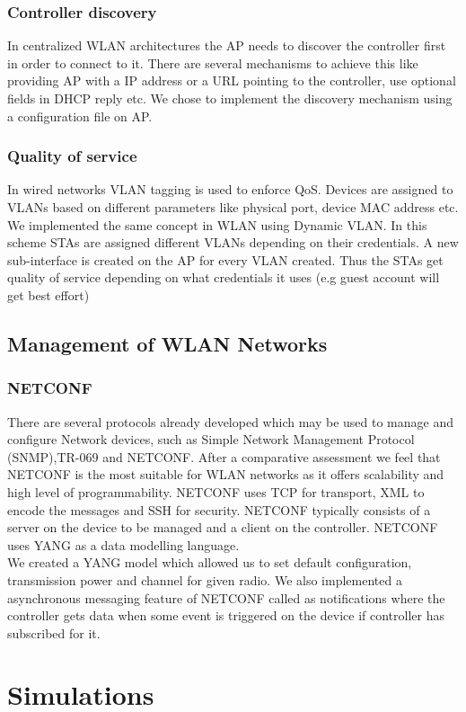 \documentclass[12pt]{article}
\begin{document}
\subsubsection{Controller discovery}
In centralized WLAN architectures the AP needs to discover the controller first in order to connect to it. There are several mechanisms to achieve this like providing AP with a IP address or a URL pointing to the controller, use optional fields in DHCP reply etc. We chose to implement the discovery mechanism using a configuration file on AP.
\subsubsection{Quality of service}
In wired networks VLAN tagging is used to enforce QoS. Devices are assigned to VLANs based on different parameters like physical port, device MAC address etc. We implemented the same concept in WLAN using Dynamic VLAN.  In this scheme STAs are assigned different VLANs depending on their credentials. A new sub-interface is created on the AP for every VLAN created. Thus the STAs get quality of service depending on what credentials it uses (e.g guest account will get best effort)


\subsection{Management of WLAN Networks}
   \subsubsection{NETCONF\cite{NETCONF}}
    There are several protocols already developed which may be used to manage and configure Network devices, such as Simple Network Management Protocol (SNMP),TR-069 and NETCONF. After a comparative assessment we feel that NETCONF is the most suitable for WLAN networks as it offers scalability and high level of programmability. NETCONF uses TCP for transport, XML to encode the messages and SSH for security. NETCONF typically consists of a server on the device to be managed and a client on the controller. NETCONF uses YANG\cite{RFC7950} as a data modelling language.\\
    We created a YANG model which allowed us to set default configuration, transmission power and channel for given radio. We also implemented a asynchronous messaging feature of NETCONF called as notifications where the controller gets data when some event is triggered on the device if controller has subscribed for it.
 \section {Simulations}   
 
\end{document}
